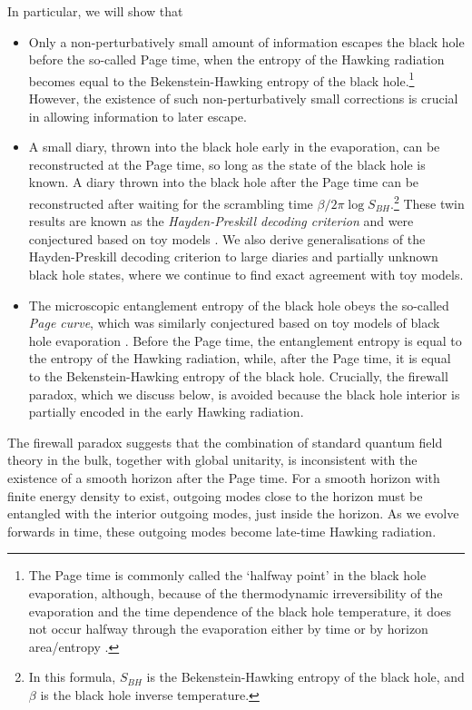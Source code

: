\documentclass[11pt,a4paper]{article}
\begin{document}
In particular, we will show that
\begin{itemize}
\item Only a non-perturbatively small amount of information escapes the black hole before the so-called Page time, when the entropy of the Hawking radiation becomes equal to the Bekenstein-Hawking entropy of the black hole.\footnote{The Page time is commonly called the `halfway point' in the black hole evaporation, although, because of the thermodynamic irreversibility of the evaporation and the time dependence of the black hole temperature, it does not occur halfway through the evaporation either by time or by horizon area/entropy \cite{page2013time}.} However, the existence of such non-perturbatively small corrections is crucial in allowing information to later escape.

\item A small diary, thrown into the black hole early in the evaporation, can be reconstructed at the Page time, so long as the state of the black hole is known. A diary thrown into the black hole after the Page time can be reconstructed after waiting for the scrambling time $\beta/2\pi \log S_{BH}$.\footnote{In this formula, $S_{BH}$ is the Bekenstein-Hawking entropy of the black hole, and $\beta$ is the black hole inverse temperature.} These twin results are known as the \emph{Hayden-Preskill decoding criterion} and were conjectured based on toy models \cite{hayden2007black}. We also derive generalisations of the Hayden-Preskill decoding criterion to large diaries and partially unknown black hole states, where we continue to find exact agreement with toy models.

\item The microscopic entanglement entropy of the black hole obeys the so-called \emph{Page curve}, which was similarly conjectured based on toy models of black hole evaporation \cite{page1993information}. Before the Page time, the entanglement entropy is equal to the entropy of the Hawking radiation, while, after the Page time, it is equal to the Bekenstein-Hawking entropy of the black hole. Crucially, the firewall paradox, which we discuss below, is avoided because the black hole interior is partially encoded in the early Hawking radiation.
\end{itemize}
The firewall paradox \cite{almheiri2013black} suggests that the combination of standard quantum field theory in the bulk, together with global unitarity, is inconsistent with the existence of a smooth horizon after the Page time. For a smooth horizon with finite energy density to exist, outgoing modes close to the horizon must be entangled with the interior outgoing modes, just inside the horizon. As we evolve forwards in time, these outgoing modes become late-time Hawking radiation. 
\end{document}
